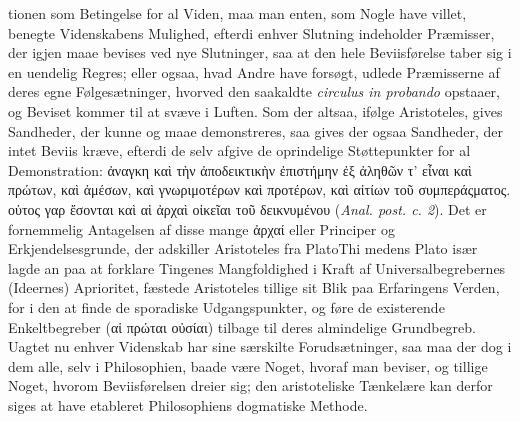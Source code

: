 \documentclass[12pt]{book}
\begin{document}
tionen som Betingelse for al Viden, maa man enten, som Nogle have villet, benegte
Videnskabens Mulighed, efterdi enhver Slutning indeholder Præmisser, der igjen maae
bevises ved nye Slutninger, saa at den hele Beviisførelse taber sig i en uendelig
Regres; eller ogsaa, hvad Andre have forsøgt, udlede Præmisserne af deres egne
Følgesætninger, hvorved den saakaldte \textit{circulus in probando} opstaaer, og
Beviset kommer til at svæve i Luften. Som der altsaa, ifølge Aristoteles, gives
Sandheder, der kunne og maae demonstreres, saa gives der ogsaa Sandheder, der intet
Beviis kræve, efterdi de selv afgive de oprindelige Støttepunkter for al
Demonstration: ἀναγκη καὶ τὴν ἀποδεικτικὴν ἐπιστήμην ἐξ ἀληθῶν τ’ εἶναι καὶ
πρώτων, καὶ ἀμέσων, καὶ γνωριμοτέρων καὶ προτέρων, καὶ αἰτίων τοῦ συμπεράςματος.
οὑτος γαρ ἔσονται καὶ αἱ ἀρχαὶ οἰκεῖαι τοῦ δεικνυμένου (\textit{Anal. post. c. 2}).
Det er fornemmelig Antagelsen af disse mange ἀρχαί eller Principer og
Erkjendelsesgrunde, der adskiller Aristoteles fra Plato\quad Thi medens Plato især
lagde an paa at forklare Tingenes Mangfoldighed i Kraft af Universalbegrebernes
(Ideernes) Aprioritet, fæstede Aristoteles tillige sit Blik paa Erfaringens Verden,
for i den at finde de sporadiske Udgangspunkter, og føre de existerende
Enkeltbegreber (αἱ πρώται οὐσίαι) tilbage til deres almindelige Grundbegreb. Uagtet
nu enhver Videnskab har sine særskilte Forudsætninger, saa maa der dog i dem alle,
selv i Philosophien, baade være Noget, hvoraf man beviser, og tillige Noget, hvorom
Beviisførelsen dreier sig; den aristoteliske Tænkelære kan derfor siges at have
etableret Philosophiens dogmatiske Methode.
\end{document}
